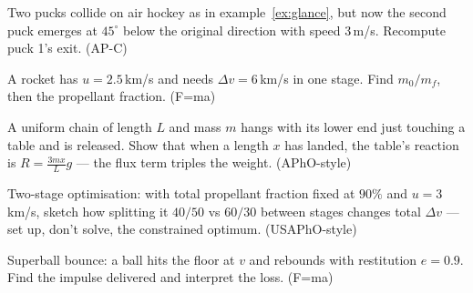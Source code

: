 \begin{exercise}[medium]
Two pucks collide on air hockey as in example~\ref{ex:glance}, but now the
second puck emerges at $45^{\circ}$ below the original direction with speed
$3$\,m/s. Recompute puck 1's exit. (AP-C)
\end{exercise}
\begin{exercise}[medium]
A rocket has $u=2.5$\,km/s and needs $\Delta v=6$\,km/s in one stage.
Find $m_0/m_f$, then the propellant fraction. (F=ma)
\end{exercise}
\begin{exercise}[hard]
A uniform chain of length $L$ and mass $m$ hangs with its lower end just
touching a table and is released. Show that when a length $x$ has landed,
the table's reaction is $R=\frac{3mx}{L}g$ --- the flux term triples the
weight. (APhO-style)
\end{exercise}
\begin{exercise}[hard]
Two-stage optimisation: with total propellant fraction fixed at $90\%$ and
$u=3$\,km/s, sketch how splitting it $40/50$ vs $60/30$ between stages
changes total $\Delta v$ --- set up, don't solve, the constrained optimum.
(USAPhO-style)
\end{exercise}
\begin{exercise}[medium]
Superball bounce: a ball hits the floor at $v$ and rebounds with
restitution $e=0.9$. Find the impulse delivered and interpret the loss.
(F=ma)
\end{exercise}
